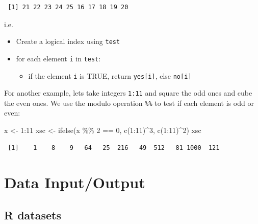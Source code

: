\documentclass[
]{book}
\newenvironment{Shaded}{\begin{snugshade}}{\end{snugshade}}
\newcommand{\DecValTok}[1]{\textcolor[rgb]{0.00,0.00,0.81}{#1}}
\newcommand{\FunctionTok}[1]{\textcolor[rgb]{0.00,0.00,0.00}{#1}}
\newcommand{\NormalTok}[1]{#1}
\newcommand{\OtherTok}[1]{\textcolor[rgb]{0.56,0.35,0.01}{#1}}
\newcommand{\SpecialCharTok}[1]{\textcolor[rgb]{0.00,0.00,0.00}{#1}}
\providecommand{\tightlist}{%
  \setlength{\itemsep}{0pt}\setlength{\parskip}{0pt}}
\begin{document}
\begin{verbatim}
 [1] 21 22 23 24 25 16 17 18 19 20
\end{verbatim}

i.e.

\begin{itemize}
\tightlist
\item
  Create a logical index using \texttt{test}
\item
  for each element \texttt{i} in \texttt{test}:

  \begin{itemize}
  \tightlist
  \item
    if the element \texttt{i} is TRUE, return \texttt{yes{[}i{]}}, else \texttt{no{[}i{]}}
  \end{itemize}
\end{itemize}

For another example, lets take integers \texttt{1:11} and square the odd ones and cube the even ones. We use the modulo operation \texttt{\%\%} to test if each element is odd or even:

\begin{Shaded}
\begin{Highlighting}[]
\NormalTok{x }\OtherTok{\textless{}{-}} \DecValTok{1}\SpecialCharTok{:}\DecValTok{11}
\NormalTok{xsc }\OtherTok{\textless{}{-}} \FunctionTok{ifelse}\NormalTok{(x }\SpecialCharTok{\%\%} \DecValTok{2} \SpecialCharTok{==} \DecValTok{0}\NormalTok{, }\FunctionTok{c}\NormalTok{(}\DecValTok{1}\SpecialCharTok{:}\DecValTok{11}\NormalTok{)}\SpecialCharTok{\^{}}\DecValTok{3}\NormalTok{, }\FunctionTok{c}\NormalTok{(}\DecValTok{1}\SpecialCharTok{:}\DecValTok{11}\NormalTok{)}\SpecialCharTok{\^{}}\DecValTok{2}\NormalTok{)}
\NormalTok{xsc}
\end{Highlighting}
\end{Shaded}

\begin{verbatim}
 [1]    1    8    9   64   25  216   49  512   81 1000  121
\end{verbatim}

\hypertarget{dataio}{%
\chapter{Data Input/Output}\label{dataio}}

\hypertarget{r-datasets}{%
\section{R datasets}\label{r-datasets}}
\end{document}
